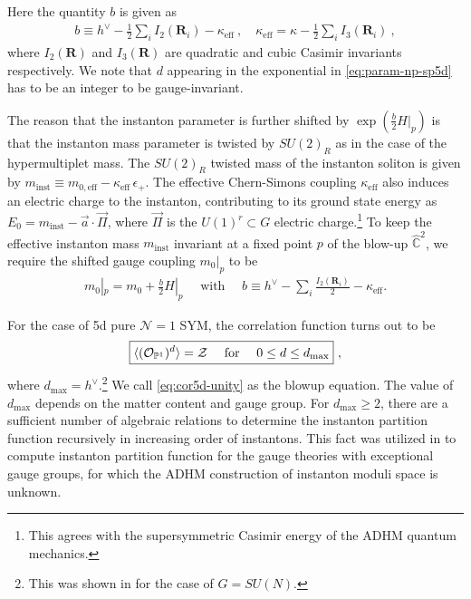 \documentclass[letterpaper, 11pt]{article}
\def\IC{\mathbb{C}}
\def\IP{\mathbb{P}}
\def\CZ{{\cal Z}}
\def\e{\epsilon}
\def\k{\kappa}
\def\half{\frac{1}{2}}
\begin{document}
Here the quantity $b$ is given as 
\begin{align}
 b \equiv h^\vee - \frac{1}{2} \sum_i I_2(\mathbf{R}_i) - \kappa_{\textrm{eff}} \ , \quad \kappa_{\textrm{eff}} = \kappa - \half \sum_i I_3(\mathbf{R}_i) \ , 
\end{align}
where $I_2(\mathbf{R})$ and $I_3(\mathbf{R})$ are quadratic and cubic Casimir invariants respectively. 
We note that $d$ appearing in the exponential in \eqref{eq:param-np-sp5d} has to be an integer to be gauge-invariant.

The reason that the instanton parameter is further shifted by $\exp(\frac{b}{2} H|_p) $ is that the instanton mass parameter is twisted by $SU(2)_R$ as in the case of the hypermultiplet mass. The $SU(2)_R$ twisted mass of the instanton soliton is given by $m_\text{inst} \equiv m_{0, \textrm{eff}} - \kappa_\text{eff}\,\e_+$. The effective Chern-Simons coupling $\k_{\textrm{eff}}$ also induces an electric charge to the instanton, contributing to its ground state energy as $E_0 = m_\text{inst} - \vec{a} \cdot \vec{\Pi}$, where $\vec{\Pi}$ is the $U(1)^r \subset G$ electric charge.\footnote{This agrees with the supersymmetric Casimir energy of the ADHM quantum mechanics.} To keep the effective instanton mass $m_\text{inst}$ invariant at a fixed point $p$ of the blow-up $\hat{\IC}^2$, we require the shifted gauge coupling $m_0|_p$  to be 
\begin{align}
  \label{eq:coupling-shift}
  m_0|_p = m_0 + \frac{b}{2}H|_p \quad \text{ with }\quad
  b \equiv h^{\vee}-\sum_i\frac{I_2(\boldsymbol{R}_i)}{2} - \kappa_\text{eff}.
\end{align}

For the case of 5d pure $\mathcal{N}=1$ SYM, the correlation function turns out to be  
\begin{align}
  \label{eq:cor5d-unity}
\boxed{  \langle (\mathcal{O}_{\IP^1})^{d}\rangle = \CZ \quad \text{ for }\quad 0\leq d \leq d_\text{max} } \ , 
\end{align}
where $d_\text{max} = h^\vee$.\footnote{This was shown in \cite{Nakajima:2005fg} for the case of $G=SU(N)$.} We call \eqref{eq:cor5d-unity} as the blowup equation. The value of $d_{\text{max}}$ depends on the matter content and gauge group. For $d_\text{max} \geq 2$, there are a sufficient number of algebraic relations to determine the instanton partition function recursively in increasing order of instantons. This fact was utilized in \cite{Keller:2012da} to compute instanton partition function for the gauge theories with exceptional gauge groups, for which the ADHM construction of instanton moduli space is unknown. 
\end{document}
